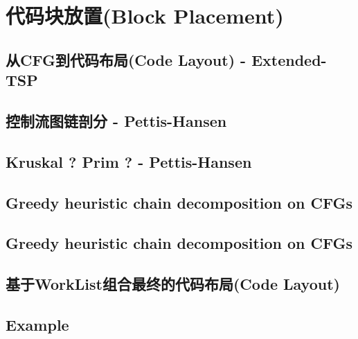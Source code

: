 \section{代码块放置(Block Placement)}
\subsection{从CFG到代码布局(Code Layout) - Extended-TSP}

\subsection{控制流图链剖分 - Pettis-Hansen}


\subsection{Kruskal ? Prim ? - Pettis-Hansen}

\subsection{Greedy heuristic chain decomposition on CFGs}

\subsection{Greedy heuristic chain decomposition on CFGs}


\subsection{基于WorkList组合最终的代码布局(Code Layout)}


\subsection{Example}

